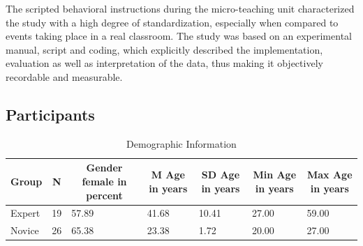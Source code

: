 \documentclass[
  man]{apa6}
\begin{document}
The scripted behavioral instructions during the micro-teaching unit characterized the study with a high degree of standardization, especially when compared to events taking place in a real classroom. The study was based on an experimental manual, script and coding, which explicitly described the implementation, evaluation as well as interpretation of the data, thus making it objectively recordable and measurable.

\hypertarget{participants}{%
\subsection{Participants}\label{participants}}

\begin{table}[h]

\begin{center}
\begin{threeparttable}

\caption{\label{tab:demographicstable}Demographic Information}

\tiny{

\begin{tabular}{lllllll}
\toprule
Group & \multicolumn{1}{c}{N} & \multicolumn{1}{c}{Gender female in percent} & \multicolumn{1}{c}{M Age in years} & \multicolumn{1}{c}{SD Age in years} & \multicolumn{1}{c}{Min Age in years} & \multicolumn{1}{c}{Max Age in years}\\
\midrule
Expert & 19 & 57.89 & 41.68 & 10.41 & 27.00 & 59.00\\
Novice & 26 & 65.38 & 23.38 & 1.72 & 20.00 & 27.00\\
\bottomrule
\end{tabular}

}

\end{threeparttable}
\end{center}

\end{table}
\end{document}
